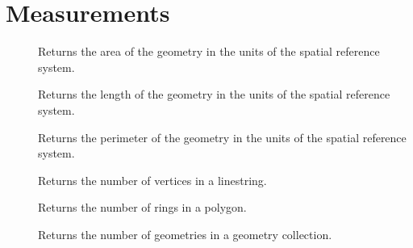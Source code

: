 \documentclass[a4paper,11pt,english]{sphinxmanual}
\begin{document}
\section{Measurements}
\label{\detokenize{postgis-functions:measurements}}\begin{description}
\item[{}] \leavevmode
Returns the area of the geometry in the units of the spatial reference system.

\item[{}] \leavevmode
Returns the length of the geometry in the units of the spatial reference system.

\item[{}] \leavevmode
Returns the perimeter of the geometry in the units of the spatial reference system.

\item[{}] \leavevmode
Returns the number of vertices in a linestring.

\item[{}] \leavevmode
Returns the number of rings in a polygon.

\item[{}] \leavevmode
Returns the number of geometries in a geometry collection.

\end{description}
\end{document}
